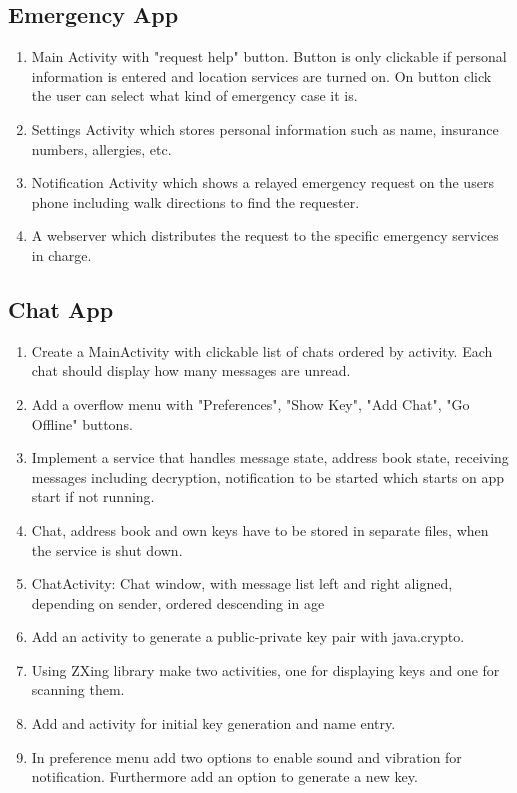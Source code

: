 \subsection{Emergency App}
	\begin{enumerate}
		\item Main Activity with "request help" button. Button is only clickable if personal information is entered and location services are turned on. On button click the user can select what kind of emergency case it is.
		\item Settings Activity which stores personal information such as name, insurance numbers, allergies, etc.
		\item Notification Activity which shows a relayed emergency request on the users phone including walk directions to find the requester.
		\item A webserver which distributes the request to the specific emergency services in charge.
	\end{enumerate}
		
\subsection{Chat App}
	\begin{enumerate}
		\item Create a MainActivity with clickable list of chats ordered by activity. Each chat should display how many messages are unread.
		\item Add a overflow menu with "Preferences", "Show Key", "Add Chat", "Go Offline" buttons.
		\item Implement a service that handles message state, address book state, receiving messages including decryption, notification to be started which starts on app start if not running.
		\item Chat, address book and own keys have to be stored in separate files, when the service is shut down.
		\item ChatActivity: Chat window, with message list left and right aligned, depending on sender, ordered descending in age
		\item Add an activity to generate a public-private key pair with java.crypto.
		\item Using ZXing library make two activities, one for displaying keys and one for scanning them.
		\item Add and activity for initial key generation and name entry.
		\item In preference menu add two options to enable sound and vibration for notification. Furthermore add an option to generate a new key.
	\end{enumerate}
			